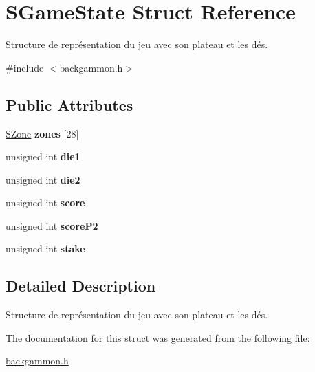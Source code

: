 \hypertarget{structSGameState}{
\section{SGameState Struct Reference}
\label{structSGameState}
}


Structure de représentation du jeu avec son plateau et les dés.  




{\ttfamily \#include $<$backgammon.h$>$}

\subsection*{Public Attributes}
\begin{DoxyCompactItemize}
\item 
\hypertarget{structSGameState_aeac3eb400501df44a2a1a748808824b8}{
\hyperlink{structSZone}{SZone} {\bfseries zones} \mbox{[}28\mbox{]}}
\label{structSGameState_aeac3eb400501df44a2a1a748808824b8}

\item 
\hypertarget{structSGameState_adf72086ec8d66012dfd97bbf0caa2726}{
unsigned int {\bfseries die1}}
\label{structSGameState_adf72086ec8d66012dfd97bbf0caa2726}

\item 
\hypertarget{structSGameState_a7af38a01cd6b2c958409615777e8c397}{
unsigned int {\bfseries die2}}
\label{structSGameState_a7af38a01cd6b2c958409615777e8c397}

\item 
\hypertarget{structSGameState_af981408708ce5d5ad7f19b2ba30e1b66}{
unsigned int {\bfseries score}}
\label{structSGameState_af981408708ce5d5ad7f19b2ba30e1b66}

\item 
\hypertarget{structSGameState_a32a518b19aafe1d18be9fc03083d16c8}{
unsigned int {\bfseries scoreP2}}
\label{structSGameState_a32a518b19aafe1d18be9fc03083d16c8}

\item 
\hypertarget{structSGameState_a415cc132b7ceee994ead2a3a0c78d5b6}{
unsigned int {\bfseries stake}}
\label{structSGameState_a415cc132b7ceee994ead2a3a0c78d5b6}

\end{DoxyCompactItemize}


\subsection{Detailed Description}
Structure de représentation du jeu avec son plateau et les dés. 

The documentation for this struct was generated from the following file:\begin{DoxyCompactItemize}
\item 
\hyperlink{backgammon_8h}{backgammon.h}\end{DoxyCompactItemize}
